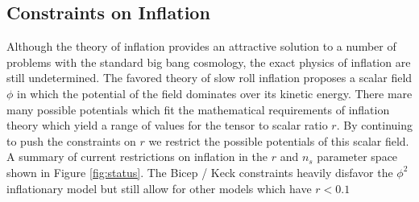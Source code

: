 \documentclass[12pt]{article}
\begin{document}
\subsection{Constraints on Inflation}
Although the theory of inflation provides an attractive solution to a number
of problems with the standard big bang cosmology, the exact physics of
inflation are still undetermined. The favored theory of slow roll inflation
proposes a scalar field $\phi$ in which the potential of the field dominates
over its kinetic energy. There mare many possible potentials which fit the
mathematical requirements of inflation theory which yield a range of values
for the tensor to scalar ratio $r$. By continuing to push the constraints on $r$
we restrict the possible potentials of this scalar field. A summary of current
restrictions on inflation in the $r$ and $n_s$ parameter space
shown in Figure \ref{fig:status}. The Bicep / Keck constraints heavily
disfavor the $\phi ^2$ inflationary model but still allow for other models which have
$r<0.1$
\end{document}
